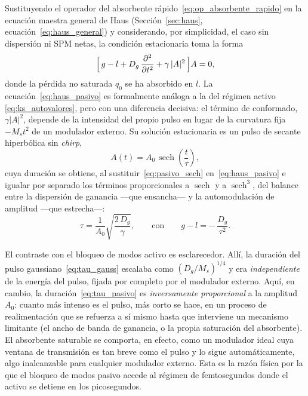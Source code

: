 Sustituyendo el operador del absorbente rápido~\eqref{eq:op_absorbente_rapido} en
la ecuación maestra general de Haus (Sección~\ref{sec:haus},
ecuación~\eqref{eq:haus_general}) y considerando, por simplicidad, el caso sin
dispersión ni SPM netas, la condición estacionaria toma la forma
%
\begin{equation}
    \Bigl[\,g - l + D_g\,\frac{\partial^2}{\partial t^2}
      + \gamma\,|A|^2 \,\Bigr] A = 0,
    \label{eq:haus_pasivo}
\end{equation}
%
donde la pérdida no saturada $q_0$ se ha absorbido en $l$. La
ecuación~\eqref{eq:haus_pasivo} es formalmente análoga a la del régimen activo
\eqref{eq:ks_autovalores}, pero con una diferencia decisiva: el término de
conformado, $\gamma|A|^2$, depende de la intensidad del propio pulso en lugar de la
curvatura fija $-M_s t^2$ de un modulador externo. Su solución estacionaria es un
pulso de secante hiperbólica sin \emph{chirp},
%
\begin{equation}
    A(t) = A_0\,\operatorname{sech}\!\left(\frac{t}{\tau}\right),
    \label{eq:pasivo_sech}
\end{equation}
%
cuya duración se obtiene, al sustituir~\eqref{eq:pasivo_sech}
en~\eqref{eq:haus_pasivo} e igualar por separado los términos proporcionales a
$\operatorname{sech}$ y a $\operatorname{sech}^3$, del balance entre la dispersión
de ganancia —que ensancha— y la automodulación de amplitud —que estrecha—:
%
\begin{equation}
    \tau = \frac{1}{A_0}\sqrt{\frac{2\,D_g}{\gamma}},
    \qquad\text{con}\qquad
    g - l = -\,\frac{D_g}{\tau^2}.
    \label{eq:tau_pasivo}
\end{equation}

El contraste con el bloqueo de modos activo es esclarecedor. Allí, la duración del
pulso gaussiano~\eqref{eq:tau_gauss} escalaba como $(D_g/M_s)^{1/4}$ y era
\emph{independiente} de la energía del pulso, fijada por completo por el modulador
externo. Aquí, en cambio, la duración~\eqref{eq:tau_pasivo} es
\emph{inversamente proporcional} a la amplitud $A_0$: cuanto más intenso es el
pulso, más corto se hace, en un proceso de realimentación que se refuerza a sí
mismo hasta que interviene un mecanismo limitante (el ancho de banda de ganancia, o
la propia saturación del absorbente). El absorbente saturable se comporta, en
efecto, como un modulador ideal cuya ventana de transmisión es tan breve como el
pulso y lo sigue automáticamente, algo inalcanzable para cualquier modulador
externo. Esta es la razón física por la que el bloqueo de modos pasivo accede al
régimen de femtosegundos donde el activo se detiene en los picosegundos.

